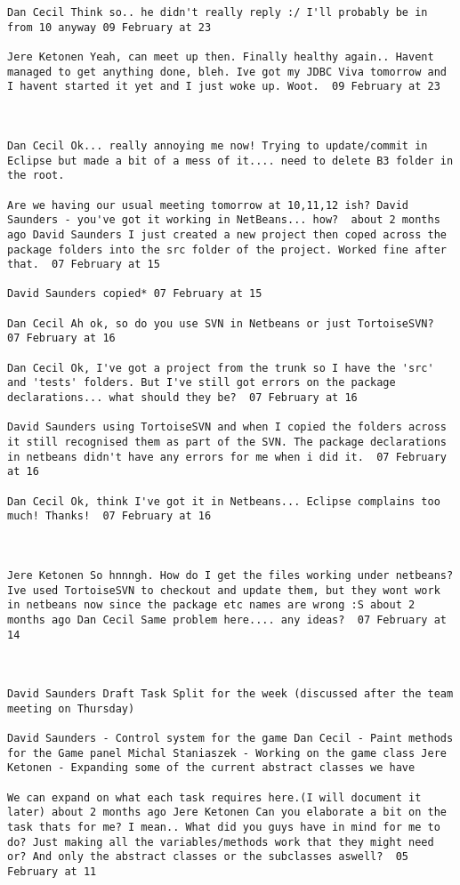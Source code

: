 \begin{verbatim}
Dan Cecil Think so.. he didn't really reply :/ I'll probably be in
from 10 anyway 09 February at 23

Jere Ketonen Yeah, can meet up then. Finally healthy again.. Havent
managed to get anything done, bleh. Ive got my JDBC Viva tomorrow and
I havent started it yet and I just woke up. Woot.  09 February at 23



Dan Cecil Ok... really annoying me now! Trying to update/commit in
Eclipse but made a bit of a mess of it.... need to delete B3 folder in
the root.

Are we having our usual meeting tomorrow at 10,11,12 ish? David
Saunders - you've got it working in NetBeans... how?  about 2 months
ago David Saunders I just created a new project then coped across the
package folders into the src folder of the project. Worked fine after
that.  07 February at 15

David Saunders copied* 07 February at 15

Dan Cecil Ah ok, so do you use SVN in Netbeans or just TortoiseSVN?
07 February at 16

Dan Cecil Ok, I've got a project from the trunk so I have the 'src'
and 'tests' folders. But I've still got errors on the package
declarations... what should they be?  07 February at 16

David Saunders using TortoiseSVN and when I copied the folders across
it still recognised them as part of the SVN. The package declarations
in netbeans didn't have any errors for me when i did it.  07 February
at 16

Dan Cecil Ok, think I've got it in Netbeans... Eclipse complains too
much! Thanks!  07 February at 16



Jere Ketonen So hnnngh. How do I get the files working under netbeans?
Ive used TortoiseSVN to checkout and update them, but they wont work
in netbeans now since the package etc names are wrong :S about 2
months ago Dan Cecil Same problem here.... any ideas?  07 February at
14



David Saunders Draft Task Split for the week (discussed after the team
meeting on Thursday)

David Saunders - Control system for the game Dan Cecil - Paint methods
for the Game panel Michal Staniaszek - Working on the game class Jere
Ketonen - Expanding some of the current abstract classes we have

We can expand on what each task requires here.(I will document it
later) about 2 months ago Jere Ketonen Can you elaborate a bit on the
task thats for me? I mean.. What did you guys have in mind for me to
do? Just making all the variables/methods work that they might need
or? And only the abstract classes or the subclasses aswell?  05
February at 11


\end{verbatim}
